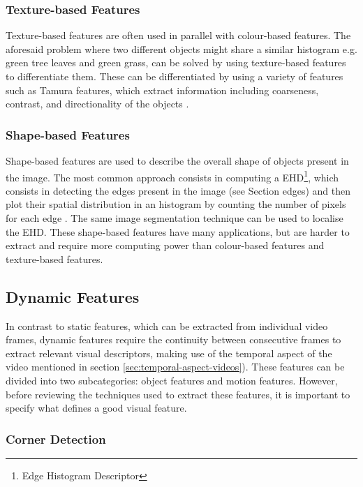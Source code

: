\subsubsection{Texture-based Features}

Texture-based features are often used in parallel with colour-based features. The aforesaid problem where two different objects might share a similar histogram e.g. green tree leaves and green grass, can be solved by using texture-based features to differentiate them. These can be differentiated by using a variety of features such as Tamura features, which extract information including coarseness, contrast, and directionality of the objects \cite{amir2003ibm}. 

\subsubsection{Shape-based Features}

Shape-based features are used to describe the overall shape of objects present in the image. The most common approach consists in computing a EHD\footnote{Edge Histogram Descriptor}, which consists in detecting the edges present in the image (see Section edges) and then plot their spatial distribution in an histogram by counting the number of pixels for each edge \cite{hauptmann2004informedia}. The same image segmentation technique can be used to localise the EHD. These shape-based features have many applications, but are harder to extract and require more computing power than colour-based features and texture-based features.


\subsection{Dynamic Features}
\label{sec:dynamic-features}

In contrast to static features, which can be extracted from individual video frames, dynamic features require the continuity between consecutive frames to extract relevant visual descriptors, making use of the temporal aspect of the video mentioned in section \ref{sec:temporal-aspect-videos}). These features can be divided into two subcategories: object features and motion features. However, before reviewing the techniques used to extract these features, it is important to specify what defines a good visual feature.

\subsubsection{Corner Detection}

